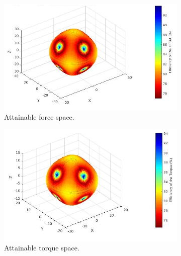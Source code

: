 \begin{figure}[!ht]
  \begin{center}
  \begin{subfigure}[b]{0.42\textwidth}
    \centering
    \includegraphics[width=\linewidth]{images/Quad_design_1_fspace.jpg}
    \caption{Attainable force space.} \label{fig:deisgn2_fspace}
  \end{subfigure}
  \hspace*{\fill} %
  \begin{subfigure}[b]{0.4\textwidth}
    \centering
    \includegraphics[width=\linewidth]{images/Quad_design_1_tspace.jpg}
    \caption{Attainable torque space.} \label{fig:deisgn2_tspace}
  \end{subfigure}
  \begin{subfigure}[b]{0.45\textwidth}
    \centering

\end{subfigure}
\end{center}
\end{figure}
